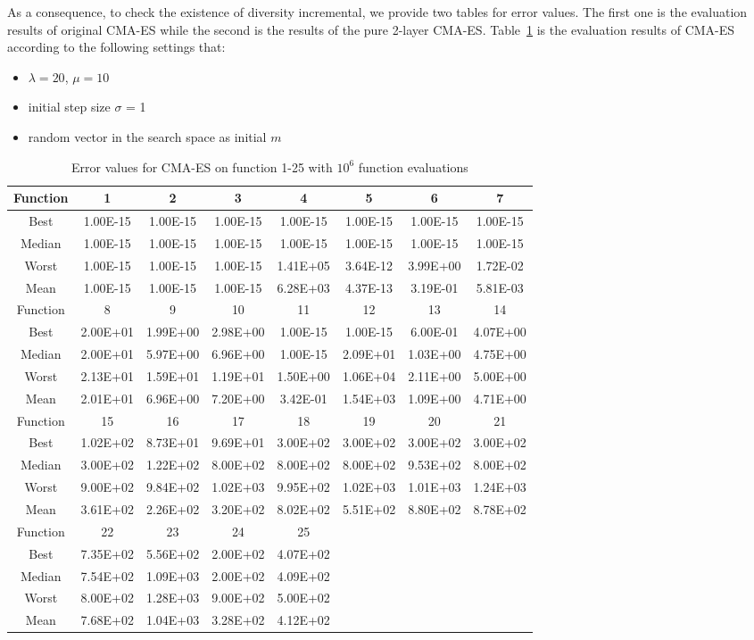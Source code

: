 As a consequence, to check the existence of diversity incremental,
we provide two tables for error values. The first one is the evaluation
results of original CMA-ES while the second is the results of the pure
2-layer CMA-ES.
Table~\ref{table:errorCMAES} is the evaluation results of CMA-ES
according to the following settings that:
\begin{itemize}
  \item{$\lambda = 20$, $\mu = 10$}
  \item{initial step size $\sigma$ = 1}
  \item{random vector in the search space as initial $m$}
\end{itemize}  
\begin{table}[h]
\footnotesize
  \centering
\begin{tabular}{@{}cccccccc@{}}
\toprule
Function&1       &2       &3       &4       &5       &6       &7     \\ \midrule
Best    &1.00E-15&1.00E-15&1.00E-15&1.00E-15&1.00E-15&1.00E-15&1.00E-15 \\
Median  &1.00E-15&1.00E-15&1.00E-15&1.00E-15&1.00E-15&1.00E-15&1.00E-15\\
Worst   &1.00E-15&1.00E-15&1.00E-15&1.41E+05&3.64E-12&3.99E+00&1.72E-02\\
Mean    &1.00E-15&1.00E-15&1.00E-15&6.28E+03&4.37E-13&3.19E-01&5.81E-03\\\midrule
Function&8       &9       &10      &11      &12      &13      &14      \\\midrule
Best    &2.00E+01&1.99E+00&2.98E+00&1.00E-15&1.00E-15&6.00E-01&4.07E+00\\
Median  &2.00E+01&5.97E+00&6.96E+00&1.00E-15&2.09E+01&1.03E+00&4.75E+00 \\
Worst   &2.13E+01&1.59E+01&1.19E+01&1.50E+00&1.06E+04&2.11E+00&5.00E+00\\
Mean    &2.01E+01&6.96E+00&7.20E+00&3.42E-01&1.54E+03&1.09E+00&4.71E+00\\\midrule
Function&15      &16      &17      &18      &19      &20      &21\\\midrule
Best    &1.02E+02&8.73E+01&9.69E+01&3.00E+02&3.00E+02&3.00E+02&3.00E+02\\
Median  &3.00E+02&1.22E+02&8.00E+02&8.00E+02&8.00E+02&9.53E+02&8.00E+02\\
Worst   &9.00E+02&9.84E+02&1.02E+03&9.95E+02&1.02E+03&1.01E+03&1.24E+03\\
Mean    &3.61E+02&2.26E+02&3.20E+02&8.02E+02&5.51E+02&8.80E+02&8.78E+02\\\midrule
Function&22      &23      &24      &25&&&\\\midrule
Best    &7.35E+02&5.56E+02&2.00E+02&4.07E+02&&&\\
Median  &7.54E+02&1.09E+03&2.00E+02&4.09E+02&&&\\
Worst   &8.00E+02&1.28E+03&9.00E+02&5.00E+02&&&\\
Mean    &7.68E+02&1.04E+03&3.28E+02&4.12E+02&&&\\\bottomrule
\end{tabular}
\caption{Error values for CMA-ES on function 1-25 with $10^6$ function evaluations}
\label{table:errorCMAES}
\end{table}

